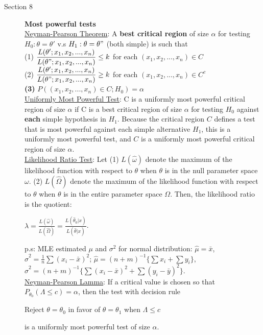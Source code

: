 \documentclass[10pt,landscape]{article}
\begin{document}
\begin{multicols}{3}
	
	\begin{description}
		\item[Section 8] \textbf{Most powerful tests }\\
		\underline{Neyman-Pearson Theorem}: A \textbf{best critical region} of size $\alpha$ for testing $H_0: \theta = \theta '$ v.s $H_1: \theta = \theta "$ (both simple) is such that \\
		(1) $\dfrac{L(\theta ' ; x_1, x_2, ..., x_n)}{L(\theta " ; x_1, x_2, ..., x_n)}\leq k$ for each $(x_1, x_2, ..., x_n) \in C$\\
		(2) $\dfrac{L(\theta ' ; x_1, x_2, ..., x_n)}{L(\theta " ; x_1, x_2, ..., x_n)}\geq k$ for each $(x_1, x_2, ..., x_n) \in C^c$\\
		\textbf{(3)} $P((x_1, x_2, ..., x_n) \in C; H_0) = \alpha$ \\
		\underline{Uniformly Most Powerful Test}: C is a uniformly most powerful critical region of size $\alpha$ if C is a best critical region of size $\alpha$ for testing $H_0$ against \textbf{each} simple hypothesis in $H_1$. Because the critical region $C$ defines a test that is most powerful against each simple alternative $H_1$, this is a uniformly most powerful test, and $C$ is a uniformly most powerful critical region of size $\alpha$.\\
		\underline{Likelihood Ratio Test}: 
		Let (1) $L(\hat{\omega})$ denote the maximum of the likelihood function with respect to $\theta$ when $\theta$ is in the null parameter space $\omega$. (2) $L(\hat\Omega)$ denote the maximum of the likelihood function with respect to $\theta$ when $\theta$ is in the entire parameter space $\Omega$. Then, the likelihood ratio is the quotient: \\
		\begin{center}		
		$\lambda = \frac{L(\hat{\omega})}{L({\hat{\Omega}})} = \frac{L(\hat{\theta}_0|x)}{L(\hat{\theta}|x)}$.\\  %
		\end{center}		
		p.s: MLE estimated $\mu$ and $\sigma^2$ for normal distribution: $\hat{\mu} = \bar{x}$, $\hat{\sigma}^2 = \frac{1}{n}\sum (x_i - \bar{x})^2$; $\hat{\mu} = (n+m)^{-1}\{\sum x_i + \sum y_i \}$, $\hat{\sigma}^2 = (n+m)^{-1} \{\sum (x_i - \bar{x})^2 + \sum (y_i - \bar{y})^2\}$.\\
		\underline{Neyman-Pearson Lamma}: If a critical value is chosen so that $P_{\theta_0}(\Lambda \leq c) = \alpha$, then the test with decision rule \\
		\begin{center}
		Reject $\theta = \theta_0$ in favor of $\theta = \theta_1$ when $\Lambda \leq c$
		\end{center}
		is a uniformly most powerful test of size $\alpha$.
	\end{description}	  
    
\end{multicols}
\end{document}
